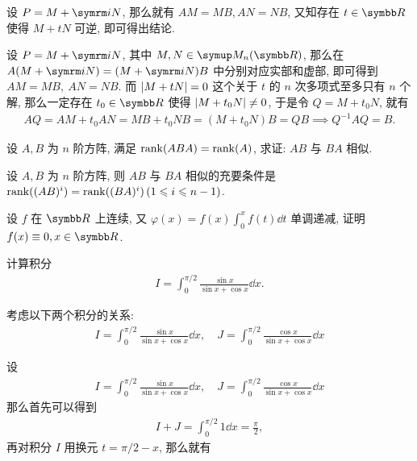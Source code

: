 \begin{exercise}[series=exer]
    \begin{hint}
        设 $ P = M + \mi N $, 那么就有 $ AM = MB, AN = NB $, 又知存在 $ t \in \R $ 使得 $ M + tN $ 可逆, 即可得出结论.
    \end{hint}
    \begin{answer}
        设 $ P = M + \mi N $, 其中 $ M, N \in \MM $, 那么在 $ A(M + \mi N) = (M + \mi N)B $ 中分别对应实部和虚部, 即可得到 $ AM = MB,\ AN = NB $. 而 $ \abs{M + tN} = 0 $ 这个关于 $ t $ 的 $ n $ 次多项式至多只有 $ n $ 个解, 那么一定存在 $ t_{0} \in \R $ 使得 $ \abs{M + t_{0}N} \ne 0 $, 于是令 $ Q = M + t_{0}N $, 就有
        \begin{align*}
            AQ = AM + t_{0}AN = MB + t_{0}NB = (M + t_{0}N)B = QB \implies Q^{-1}AQ = B.
        \end{align*}
    \end{answer}
    \item 设 $ A, B $ 为 $ n $ 阶方阵, 满足 $ \rank(ABA) = \rank(A) $, 求证: $ AB $ 与 $ BA $ 相似.
    \item 设 $ A, B $ 为 $ n $ 阶方阵, 则 $ AB $ 与 $ BA $ 相似的充要条件是 $ \rank((AB)^{i}) = \rank((BA)^{i})\,(1 \leqslant i \leqslant n - 1) $.
    \item 设 $ f $ 在 $ \R $ 上连续, 又 $ \varphi(x) = f(x)\int_{0}^{x} f(t) \dd{t} $ 单调递减, 证明 $ f(x) \equiv 0, x\in\R $.
    \item 计算积分
    \begin{align*}
        I = \int_{0}^{\pi/2} \frac{\sin x}{\sin x + \cos x} \dd{x}.
    \end{align*}
    \begin{hint}
        考虑以下两个积分的关系:
        \begin{align*}
            I = \int_{0}^{\pi/2} \frac{\sin x}{\sin x + \cos x} \dd{x}, \quad J = \int_{0}^{\pi/2} \frac{\cos x}{\sin x + \cos x} \dd{x}
        \end{align*}
    \end{hint}
    \begin{answer}
        设 
        \begin{align*}
            I = \int_{0}^{\pi/2} \frac{\sin x}{\sin x + \cos x} \dd{x}, \quad J = \int_{0}^{\pi/2} \frac{\cos x}{\sin x + \cos x} \dd{x}
        \end{align*}
        那么首先可以得到 
        \begin{align*}
            I + J = \int_{0}^{\pi/2} 1\dd{x} = \frac{\pi}{2},
        \end{align*}
        再对积分 $ I $ 用换元 $ t = \pi/2 - x $, 那么就有

\end{answer}
\end{exercise}
